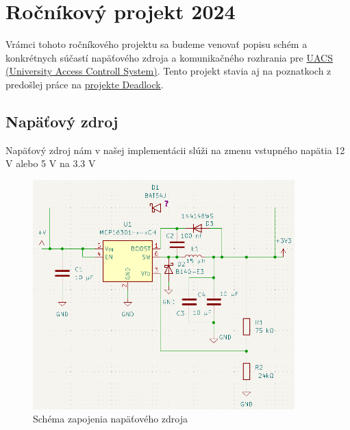 \documentclass[12pt, twoside]{book}
\begin{document}
     



\section*{Ročníkový projekt 2024}

Vrámci tohoto ročníkového projektu sa budeme venovať popisu schém a konkrétnych súčastí napäťového zdroja a komunikačného rozhrania pre \href{https://github.com/ostertag/UACS}{UACS (University Access Controll System)}. Tento projekt stavia aj na poznatkoch z predošlej práce na \href{https://gitlab.com/project-deadlock}{projekte Deadlock}.

\subsection*{Napäťový zdroj}

Napäťový zdroj nám v našej implementácii slúži na zmenu vstupného napätia 12 V alebo 5 V na 3.3 V

\begin{figure}[h!]
    \centerline{\includegraphics[width=0.9\textwidth]{schematic_power_suplly.png}}
    \caption{Schéma zapojenia napäťového zdroja}
    \label{obr:shc1}
\end{figure}
\end{document}
